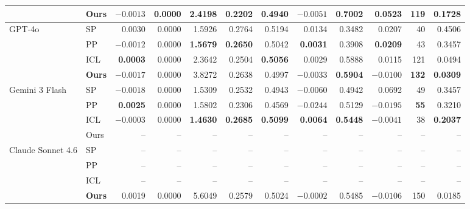 \begin{table}[t]
{\begin{tabular}{llrrrrrrrrrr}
& \textbf{Ours} & $-0.0013$ & 0.0000 & \textbf{2.4198} & 0.2202 & 0.4940 & $-0.0051$ & 0.7002 & \textbf{0.0523} & 119 & 0.1728 \\
\midrule
GPT-4o
& SP   & 0.0030 & 0.0000 & 1.5926 & 0.2764 & 0.5194 & 0.0134 & 0.3482 & 0.0207 & 40  & 0.4506 \\
& PP   & $-0.0012$ & 0.0000 & \textbf{1.5679} & \textbf{0.2650} & 0.5042 & \textbf{0.0031} & 0.3908 & \textbf{0.0209} & 43  & 0.3457 \\
& ICL  & \textbf{0.0003} & 0.0000 & 2.3642 & 0.2504 & \textbf{0.5056} & 0.0029 & 0.5888 & 0.0115 & 121 & 0.0494 \\
& \textbf{Ours} & $-0.0017$ & 0.0000 & 3.8272 & 0.2638 & 0.4997 & $-0.0033$ & \textbf{0.5904} & $-0.0100$ & \textbf{132} & \textbf{0.0309} \\
\midrule
Gemini 3 Flash
& SP   & $-0.0018$ & 0.0000 & 1.5309 & 0.2532 & 0.4943 & $-0.0060$ & 0.4942 & 0.0692 & 49 & 0.3457 \\
& PP   & \textbf{0.0025} & 0.0000 & 1.5802 & 0.2306 & 0.4569 & $-0.0244$ & 0.5129 & $-0.0195$ & \textbf{55} & 0.3210 \\
& ICL  & $-0.0003$ & 0.0000 & \textbf{1.4630} & \textbf{0.2685} & \textbf{0.5099} & \textbf{0.0064} & \textbf{0.5448} & \textbf{$-0.0041$} & 38 & \textbf{0.2037} \\
& Ours & -- & -- & -- & -- & -- & -- & -- & -- & -- & -- \\
\midrule
Claude Sonnet 4.6
& SP   & -- & -- & -- & -- & -- & -- & -- & -- & -- & -- \\
& PP   & -- & -- & -- & -- & -- & -- & -- & -- & -- & -- \\
& ICL  & -- & -- & -- & -- & -- & -- & -- & -- & -- & -- \\
& \textbf{Ours} & 0.0019 & 0.0000 & 5.6049 & 0.2579 & 0.5024 & $-0.0002$ & 0.5485 & $-0.0106$ & 150 & 0.0185 \\
\bottomrule
\end{tabular}}
\end{table}


